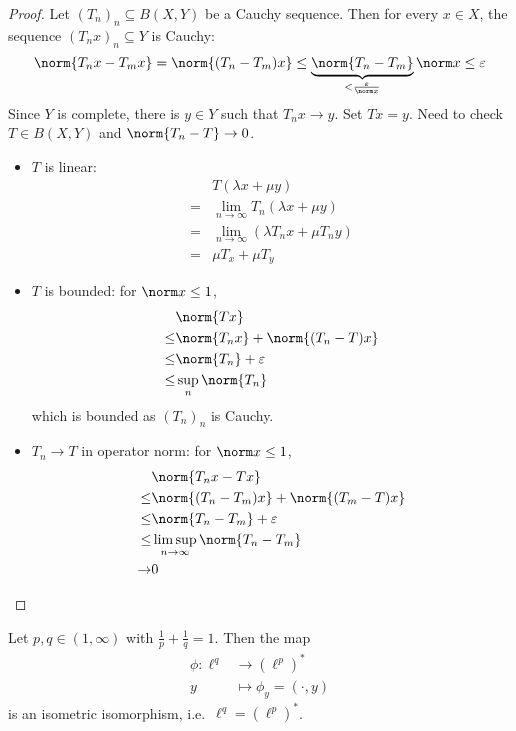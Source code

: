 \documentclass[a4paper]{article}
\begin{document}
\begin{proof}
  Let \((T_n)_n \subseteq B(X, Y)\) be a Cauchy sequence. Then for every \(x \in X\), the sequence \((T_nx)_n \subseteq Y\) is Cauchy:
  \[
    \norm{T_n x - T_mx}
    = \norm{(T_n - T_m) x}
    \leq \underbrace{\norm{T_n - T_m}}_{< \frac{\varepsilon}{\norm x}} \norm x
    \leq \varepsilon
  \]
  Since \(Y\) is complete, there is \(y \in Y\) such that \(T_nx \to y\). Set \(Tx = y\). Need to check \(T \in B(X, Y)\) and \(\norm{T_n - T} \to 0\).
  \begin{itemize}
  \item \(T\) is linear:
    \begin{align*}
      &T(\lambda x + \mu y) \\
      =& \lim_{n \to \infty} T_n(\lambda x + \mu y) \\
      =& \lim_{n \to \infty} (\lambda T_n x + \mu T_n y) \\
      =& \mu T_x + \mu T_y
    \end{align*}
  \item \(T\) is bounded: for \(\norm x \leq 1\),
    \begin{align*}
      &\norm{Tx} \\
      \leq& \norm{T_nx} + \norm{(T_n - T) x} \\
      \leq& \norm{T_n} + \varepsilon \\
      \leq& \sup_n \norm{T_n}
    \end{align*}
    which is bounded as \((T_n)_n\) is Cauchy.
  \item \(T_n \to T\) in operator norm: for \(\norm x \leq 1\),
    \begin{align*}
      &\norm{T_n x - Tx} \\
      \leq& \norm{(T_n - T_m) x} + \norm{(T_m - T) x} \\
      \leq& \norm{T_n - T_m} + \varepsilon \\
      \leq& \limsup_{n \to \infty} \norm{T_n - T_m} \\
      \to& 0
    \end{align*}
  \end{itemize}
\end{proof}

\begin{eg}
  Let \(p, q \in (1, \infty)\) with \(\frac{1}{p} + \frac{1}{q} = 1\). Then the map
  \begin{align*}
    \phi: \ell^q &\to (\ell^p)^* \\
    y &\mapsto \phi_y = (\cdot, y)
  \end{align*}
  is an isometric isomorphism, i.e.\ \(\ell^q = (\ell^p)^*\).

\end{eg}
\end{document}
